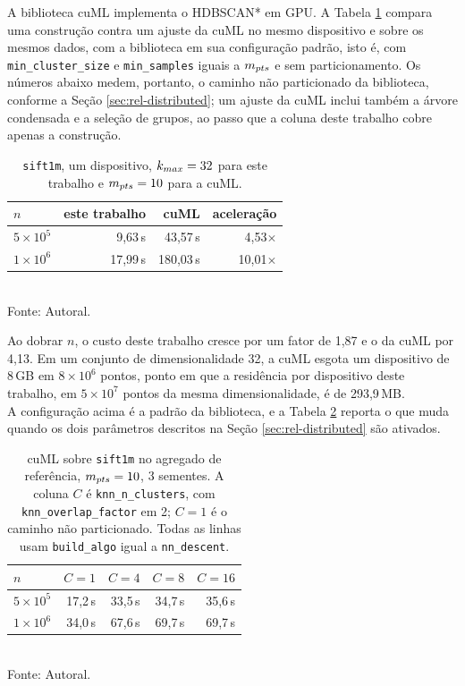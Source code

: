 A biblioteca cuML \cite{cuml} implementa o \ac{HDBSCAN*} em \ac{GPU}. A Tabela \ref{tab:cuml} compara uma construção contra um ajuste da cuML no mesmo dispositivo e sobre os mesmos dados, com a biblioteca em sua configuração padrão, isto é, com \texttt{min\_cluster\_size} e \texttt{min\_samples} iguais a $m_{pts}$ e sem particionamento. Os números abaixo medem, portanto, o caminho não particionado da biblioteca, conforme a Seção \ref{sec:rel-distributed}; um ajuste da cuML inclui também a árvore condensada e a seleção de grupos, ao passo que a coluna deste trabalho cobre apenas a construção.\\

\begin{table}[htb!]
\caption{\label{tab:cuml} \texttt{sift1m}, um dispositivo, $k_{max} = 32$ para este trabalho e $m_{pts} = 10$ para a cuML.}
\centering
\footnotesize
\begin{tabular}{@{}lrrr@{}}
\toprule
$n$ & este trabalho & cuML & aceleração \\
\midrule
$5\times10^5$ & 9,63\,s  & 43,57\,s  & 4,53$\times$ \\
$1\times10^6$ & 17,99\,s & 180,03\,s & 10,01$\times$ \\
\bottomrule
\end{tabular}\\
Fonte: Autoral.
\end{table}

Ao dobrar $n$, o custo deste trabalho cresce por um fator de 1,87 e o da cuML por 4,13. Em um conjunto de dimensionalidade 32, a cuML esgota um dispositivo de 8\,GB em $8 \times 10^6$ pontos, ponto em que a residência por dispositivo deste trabalho, em $5 \times 10^7$ pontos da mesma dimensionalidade, é de 293,9\,MB.\\

A configuração acima é a padrão da biblioteca, e a Tabela \ref{tab:cuml-part} reporta o que muda quando os dois parâmetros descritos na Seção \ref{sec:rel-distributed} são ativados.\\

\begin{table}[htb!]
\caption{\label{tab:cuml-part} cuML sobre \texttt{sift1m} no agregado de referência, $m_{pts} = 10$, 3 sementes. A coluna $C$ é \texttt{knn\_n\_clusters}, com \texttt{knn\_overlap\_factor} em 2; $C = 1$ é o caminho não particionado. Todas as linhas usam \texttt{build\_algo} igual a \texttt{nn\_descent}.}
\centering
\footnotesize
\begin{tabular}{@{}lrrrr@{}}
\toprule
$n$ & $C = 1$ & $C = 4$ & $C = 8$ & $C = 16$ \\
\midrule
$5\times10^5$ & 17,2\,s & 33,5\,s & 34,7\,s & 35,6\,s \\
$1\times10^6$ & 34,0\,s & 67,6\,s & 69,7\,s & 69,7\,s \\
\bottomrule
\end{tabular}\\
Fonte: Autoral.
\end{table}


